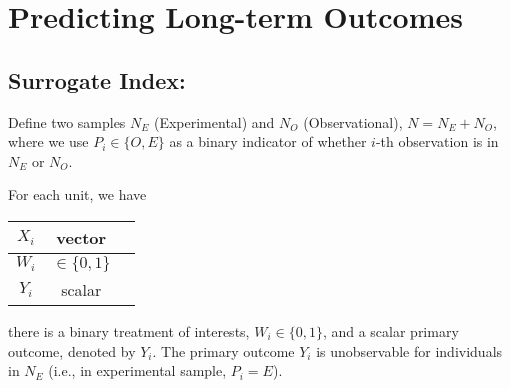 \chapter{Predicting Long-term Outcomes}
\section{Surrogate Index: \cite{athey2019surrogate}}
Define two samples $N_E$ (Experimental) and $N_O$ (Observational), $N=N_E+N_O$, where we use $P_i\in\{O,E\}$ as a binary indicator of whether $i$-th observation is in $N_E$ or $N_O$.

For each unit, we have
\begin{center}
    \begin{tabular}{ccc}
        \hline
            $X_i$& vector &\\
        \hline
            $W_i$& $\in\{0,1\}$ &\\
        \hline
            $Y_i$& scalar &\\
        \hline
    \end{tabular}
\end{center}
there is a binary treatment of interests, $W_i\in\{0,1\}$, and a scalar primary outcome, denoted by $Y_i$. The primary outcome $Y_i$ is unobservable for individuals in $N_E$ (i.e., in experimental sample, $P_i=E$).